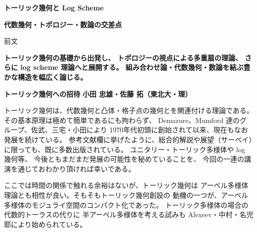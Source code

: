 \documentclass[uplatex,dvipdfmx]{jlreq}
\begin{document}
\begin{center}
  \vspace*{20pt}
  {\Huge\bfseries トーリック幾何と Log Scheme}

  \vspace{30pt}

  {\Large\bfseries 代数幾何・トポロジー・数論の交差点}

  \vspace{50pt}

  {\large 前文}

  \vspace{10pt}

  \parbox{0.85\textwidth}{
    \large\bfseries
    トーリック幾何の基礎から出発し、
    トポロジーの視点による多重扇の理論、
    さらに log scheme 理論へと展開する。
    組み合わせ論・代数幾何・数論を結ぶ豊かな構造を幅広く論じる。
  }
\end{center}

\vfill

\newpage

\noindent
{\large\bfseries トーリック幾何への招待}
\hfill
{\large\bfseries 小田 忠雄・佐藤 拓（東北大・理）}

\bigskip

トーリック幾何は、代数幾何と凸体・格子点の幾何とを関連付ける理論である。
その基本原理は極めて簡単であるにも拘わらず、
Demazure、Mumford 達のグループ、佐武、三宅・小田により
1970年代初頭に創始されて以来、現在もなお発展を続けている。
参考文献欄に挙げたように、総合的解説や展望（サーベイ）に限っても、既に多数出版されている。
ユニタリー・トーリック多様体や log 幾何等、
今後ともまだまだ発展の可能性を秘めていることを、
今回の一連の講演を通じておわかり頂ければ幸いである。

ここでは時間の関係で触れる余裕はないが、トーリック幾何は
アーベル多様体理論とも相性が良い。そもそもトーリック幾何創設の
動機の一つが、アーベル多様体のモジュライ空間のコンパクト化であった。
トーリック多様体の場合の代数的トーラスの代りに
半アーベル多様体を考える試みも Alexeev・中村・名児耶により始められている。
\end{document}
